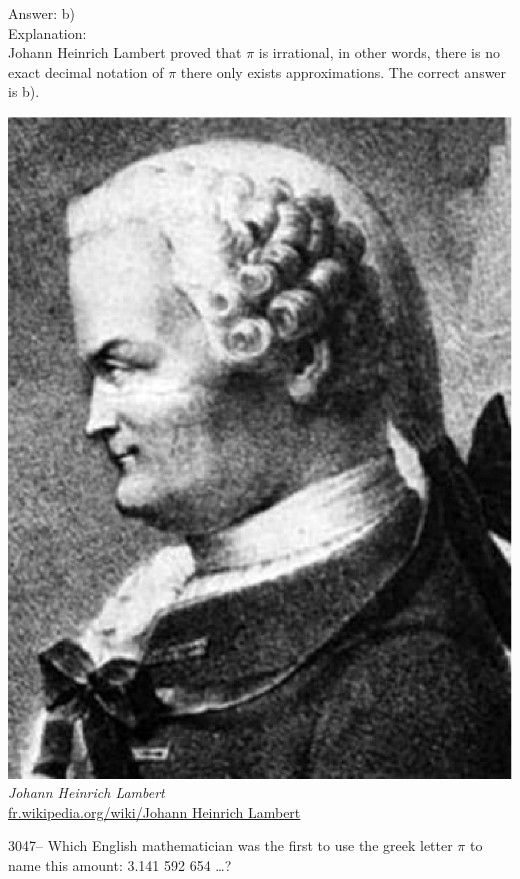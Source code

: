 \documentclass[letterpaper, 12pt]{article}
\begin{document}
Answer: b)\\

Explanation:\\
Johann Heinrich Lambert proved that $\pi$ is irrational, in other words, there is no exact decimal notation of $\pi$ there only exists approximations. The correct answer is b).\\
\begin{center}
\includegraphics[scale=0.25]{JHLambert.eps}\\
\emph{{\small Johann Heinrich Lambert}}\\
\href{http://fr.wikipedia.org/wiki/Johann Heinrich Lambert}{fr.wikipedia.org/wiki/Johann Heinrich Lambert}\\[5mm]
\end{center}



3047-- Which English mathematician was the first to use the greek letter $\pi$ to name this amount: 3.141 592 654 \dots ?\\
\end{document}
